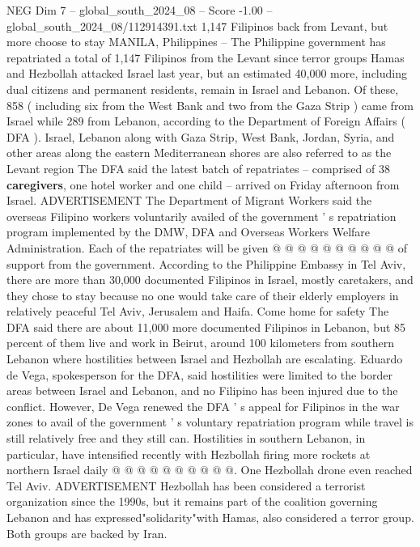 \begin{textsample}{NEG Dim 7 – global\_south\_2024\_08 – Score -1.00 – global\_south\_2024\_08/112914391.txt}  \label{ex:f7_neg_272}
1,147 Filipinos back from Levant, but more choose to stay MANILA, Philippines -- The Philippine government has repatriated a total of 1,147 Filipinos from the Levant since terror groups Hamas and Hezbollah attacked Israel last year, but an estimated 40,000 more, including dual citizens and permanent residents, remain in Israel and Lebanon.
Of these, 858 ( including six from the West Bank and two from the Gaza Strip ) came from Israel while 289 from Lebanon, according to the Department of Foreign Affairs ( DFA ).
Israel, Lebanon along with Gaza Strip, West Bank, Jordan, Syria, and other areas along the eastern Mediterranean shores are also referred to as the Levant region The DFA said the latest batch of repatriates -- comprised of 38 \textbf{caregivers}, one hotel worker and one child -- arrived on Friday afternoon from Israel.
ADVERTISEMENT The Department of Migrant Workers said the overseas Filipino workers voluntarily availed of the government ' s repatriation program implemented by the DMW, DFA and Overseas Workers Welfare Administration.
Each of the repatriates will be given @ @ @ @ @ @ @ @ @ @ of support from the government.
According to the Philippine Embassy in Tel Aviv, there are more than 30,000 documented Filipinos in Israel, mostly caretakers, and they chose to stay because no one would take care of their elderly employers in relatively peaceful Tel Aviv, Jerusalem and Haifa.
Come home for safety The DFA said there are about 11,000 more documented Filipinos in Lebanon, but 85 percent of them live and work in Beirut, around 100 kilometers from southern Lebanon where hostilities between Israel and Hezbollah are escalating.
Eduardo de Vega, spokesperson for the DFA, said hostilities were limited to the border areas between Israel and Lebanon, and no Filipino has been injured due to the conflict.
However, De Vega renewed the DFA ' s appeal for Filipinos in the war zones to avail of the government ' s voluntary repatriation program while travel is still relatively free and they still can.
Hostilities in southern Lebanon, in particular, have intensified recently with Hezbollah firing more rockets at northern Israel daily @ @ @ @ @ @ @ @ @ @.
One Hezbollah drone even reached Tel Aviv.
ADVERTISEMENT Hezbollah has been considered a terrorist organization since the 1990s, but it remains part of the coalition governing Lebanon and has expressed"solidarity"with Hamas, also considered a terror group.
Both groups are backed by Iran.

\end{textsample}
